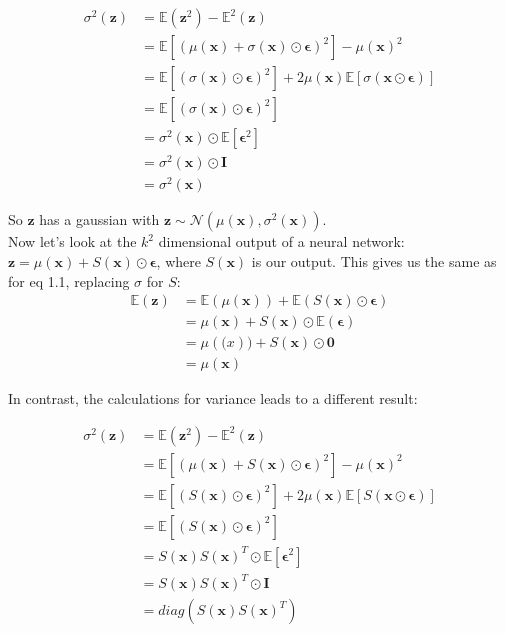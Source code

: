 \documentclass{amsart}
\numberwithin{equation}{section}
\theoremstyle{definition}
\theoremstyle{remark}
\begin{document}
\begin{equation}
\begin{split}
\sigma^2(\bm{z})
&= \mathbb{E}({\bm{z}^2})- \mathbb{E}^2(\bm{z})\\
&= \mathbb{E} \left[ \left(\mu(\bm{x}) + \sigma(\bm{x})\odot\bm{\epsilon} \right)^2\right] - \mu(\bm{x})^2\\
&= \mathbb{E}\left[ \left( \sigma(\bm{x})\odot\bm{\epsilon}\right)^2\right]+ 2 \mu(\bm{x}) \mathbb{E}\left[ \sigma(\bm{x}\odot \bm{\epsilon})\right]\\
&= \mathbb{E}\left[ \left( \sigma(\bm{x})\odot\bm{\epsilon}\right)^2\right]\\
&= \sigma^2(\bm{x})\odot \mathbb{E}\left[ \bm{\epsilon}^2\right]\\
&= \sigma^2(\bm{x})\odot \bm{I}\\
&= \sigma^2(\bm{x})
\end{split}
\end{equation}

So $\bm{z}$ has a gaussian with $\bm{z}\sim \mathcal{N}(\mu(\bm{x}), \sigma^2(\bm{x}))$.\\

Now let's look at the $k^2$ dimensional output of a neural network: 
$\bm{z} = \mu(\bm{x}) + S(\bm{x})\odot\bm{\epsilon} $, where $S(\bm{x})$ is our
output. This gives us the same as for eq 1.1, replacing $\sigma$ for $S$: \\ 

\begin{equation}
\begin{split}
\mathbb{E}(\bm{z})&= \mathbb{E}(\mu(\bm{x}))+\mathbb{E}\left(S(\bm{x})\odot \bm{\epsilon}\right) \\
&= \mu(\bm{x})+ S(\bm{x})\odot \mathbb{E}(\bm{\epsilon}) \\
&= \mu(\bm(x))+ S(\bm{x})\odot \bm{0}\\
&= \mu(\bm{x})
\end{split}
\end{equation}

In contrast, the calculations for variance leads to a different result:

\begin{equation}
\begin{split}
\sigma^2(\bm{z})&= \mathbb{E}({\bm{z}^2})- \mathbb{E}^2(\bm{z})\\
&= \mathbb{E} \left[ \left(\mu(\bm{x})+ S(\bm{x})\odot\bm{\epsilon} \right)^2\right] - \mu(\bm{x})^2\\
&= \mathbb{E}\left[ \left( S(\bm{x})\odot\bm{\epsilon}\right)^2\right]+ 2 \mu(\bm{x}) \mathbb{E}\left[ S(\bm{x}\odot \bm{\epsilon})\right]\\
&= \mathbb{E}\left[ \left( S(\bm{x})\odot\bm{\epsilon}\right)^2\right]\\
&= S(\bm{x}) S(\bm{x})^T\odot \mathbb{E}\left[ \bm{\epsilon}^2\right]\\
&= S(\bm{x}) S(\bm{x})^T\odot\bm{I}\\
&=diag \left(S(\bm{x}) S(\bm{x})^T\right)
\end{split}
\end{equation}
\end{document}
